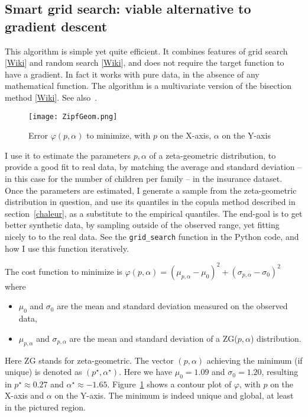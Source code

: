 \documentclass[oneside,10pt]{book}
\begin{document}
\subsection{Smart grid search: viable alternative to gradient descent}\label{butare}

This algorithm is simple yet quite efficient. It combines features of 
\textcolor{index}{grid search} [\href{https://en.wikipedia.org/wiki/Hyperparameter_optimization}{Wiki}]
 and 
\textcolor{index}{random search} [\href{https://en.wikipedia.org/wiki/Random_search}{Wiki}], and does not require the target function to have a gradient. In fact it works with pure data, in the absence of any
 mathematical function. The algorithm is a multivariate version of the 
\textcolor{index}{bisection method} [\href{https://en.wikipedia.org/wiki/Bisection_method}{Wiki}]. See also~\cite{manulo17}.

\begin{figure}%
\centering
\texttt{[image: ZipfGeom.png]}  
\caption{Error $\varphi(p,\alpha)$ to minimize, with $p$ on the X-axis, $\alpha$ on the Y-axis}
\label{fig:pytz238675}
\end{figure}

I use it to estimate the parameters $p,\alpha$ of a zeta-geometric distribution, to provide a good fit to real data, by matching the
 average and standard deviation -- in this case for the number of children per family -- in the insurance dataset. Once the parameters are estimated, I generate a sample from the zeta-geometric distribution in question, and use its quantiles in the copula method described
 in section~\ref{chaleur}, as a substitute to the empirical quantiles. The end-goal is to get better synthetic data, by sampling outside of the observed range, yet fitting nicely to to the real data. 
See the \texttt{grid\_search} function in the Python code, and how I use this function iteratively.



\noindent The cost function to minimize is 
$\varphi(p,\alpha) =(\mu_{p,\alpha}-\mu_0)^2 + (\sigma_{p,\alpha}-\sigma_0)^2$
where \vspace{1ex}

\begin{itemize}
\item $\mu_0$ and $\sigma_0$ are the mean and standard deviation measured on the observed data,
\item $\mu_{p,\alpha}$ and $\sigma_{p,\alpha}$ are the mean and standard deviation of a ZG($p,\alpha$) distribution.
\end{itemize}\vspace{1ex}
Here ZG stands for zeta-geometric. The vector $(p,\alpha)$ achieving the minimum (if unique) is
 denoted as $(p^\star,\alpha^\star)$. Here we have $\mu_0 = 1.09$ and $\sigma_0 = 1.20$,
 resulting in $p^\star\approx 0.27$ and $\alpha^\star\approx -1.65$. Figure~\ref{fig:pytz238675} shows a contour plot of $\varphi$, 
 with $p$ on the X-axis and $\alpha$ on the Y-axis. The minimum is indeed unique and global, at least in the
 pictured region. 
\end{document}
